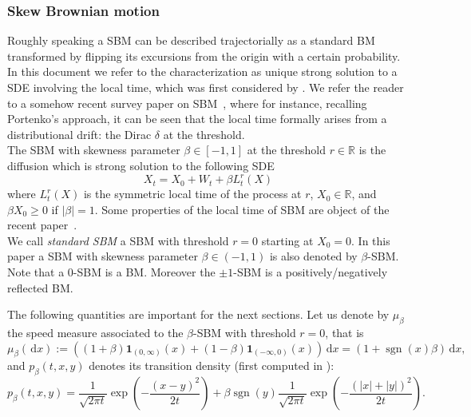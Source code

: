 \documentclass[12pt]{article}
\numberwithin{equation}{section}
\theoremstyle{definition}
\theoremstyle{remark}
\newcommand{\RR}{\mathbb{R}}
\newcommand{\ind}[1]{\mathbf{1}_{#1}}
\newcommand{\vd}{\,\mathrm{d}}
\DeclareMathOperator{\sgn}{sgn}
\begin{document}
\subsubsection{Skew Brownian motion}

Roughly speaking a SBM can be described trajectorially as 
a standard BM transformed by flipping its excursions from the origin with a certain probability.
In this document we refer to the characterization as unique strong solution to a SDE involving the local time, which was first considered by \cite{harrison-shepp_1981}. We refer the reader to a somehow recent survey paper on SBM~\cite{le}, where for instance, recalling Portenko's approach, it can be seen that the local time formally arises from a distributional drift: the Dirac $\delta$ at the threshold.\\


The SBM with skewness parameter 
$\beta\in [-1,1]$ at the threshold $r\in \RR$ is the diffusion which is strong solution to the following SDE
\begin{equation} \label{eq:SBM}
X_t=X_0 + W_t+ \beta L_t^{r}(X)
\end{equation}
where $L_t^{r}(X)$ is the symmetric local time of the process at $r$, $X_0\in \RR$, and $\beta X_0 \geq 0$ if $|\beta|=1$.
%
Some properties of the local time of SBM are object of the recent paper~\cite{BS19}.
\\
We call {\em standard SBM\/} a SBM with threshold $r=0$ starting at $X_0=0$. 
In this paper a SBM with skewness parameter $\beta\in (-1,1)$ is also denoted by $\beta$-SBM.
Note that a $0$-SBM is a BM. 
Moreover the $\pm 1$-SBM is a positively/negatively reflected BM.


The following quantities are important for the next sections.
Let us denote by $\mu_\beta$ the speed measure associated to the $\beta$-SBM with threshold $r=0$, that is
\begin{equation}
	\mu_\beta(\!\vd x) := \left( (1+\beta) \ind{(0,\infty)}(x) + (1-\beta) \ind{(-\infty,0)}(x) \right)\! \vd x =( 1+\sgn(x) \beta )  \vd x,
\end{equation}
and $p_\beta(t,x,y)$ denotes its transition density (first computed in \cite{walsh}): 
\begin{equation} \label{eq:SBM:density}
    p_\beta(t,x,y)
    =\frac{1}{\sqrt{2\pi t}}\exp\!\left(-\frac{(x-y)^2}{2t}\right)
    +\beta \sgn(y)\frac{1}{\sqrt{2\pi t}}\exp\!\left(-\frac{(|{x}|+|{y}|)^2}{2t}\right).
\end{equation}
\end{document}
